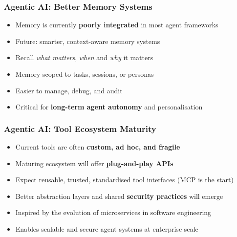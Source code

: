 \begin{frame}[fragile]\frametitle{Agentic AI: Better Memory Systems}
      \begin{itemize}
        \item Memory is currently \textbf{poorly integrated} in most agent frameworks
        \item Future: smarter, context-aware memory systems
        \item Recall \emph{what matters}, \emph{when} and \emph{why} it matters
        \item Memory scoped to tasks, sessions, or personas
        \item Easier to manage, debug, and audit
        \item Critical for \textbf{long-term agent autonomy} and personalisation
      \end{itemize}
\end{frame}

\begin{frame}[fragile]\frametitle{Agentic AI: Tool Ecosystem Maturity}
      \begin{itemize}
        \item Current tools are often \textbf{custom, ad hoc, and fragile}
        \item Maturing ecosystem will offer \textbf{plug-and-play APIs}
        \item Expect reusable, trusted, standardised tool interfaces (MCP is the start)
        \item Better abstraction layers and shared \textbf{security practices} will emerge
        \item Inspired by the evolution of microservices in software engineering
        \item Enables scalable and secure agent systems at enterprise scale
      \end{itemize}
\end{frame}

